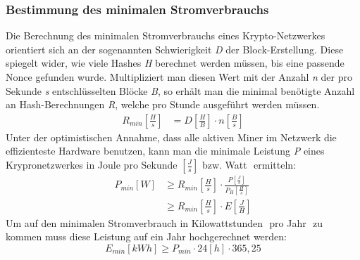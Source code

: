 \documentclass[12pt]{article}
\begin{document}
\subsubsection{Bestimmung des minimalen Stromverbrauchs}
Die Berechnung des minimalen Stromverbrauchs eines Krypto-Netzwerkes orientiert sich an der sogenannten Schwierigkeit \textit{D} der Block-Erstellung. Diese spiegelt wider, wie viele Hashes \textit{H} berechnet werden müssen, bis eine passende Nonce gefunden wurde. Multipliziert man diesen Wert mit der Anzahl \textit{n} der pro Sekunde \textit{s} entschlüsselten Blöcke \textit{B}, so erhält man die minimal benötigte Anzahl an Hash-Berechnungen \textit{R}, welche pro Stunde ausgeführt werden müssen.
\begin{align}
    R_{min}\left[\frac{H}{s}\right]&=D\left[\frac{H}{B}\right]\cdot n\left[\frac{B}{s}\right]
\end{align}
\clearpage
\noindent Unter der optimistischen Annahme, dass alle aktiven Miner im Netzwerk die effizienteste Hardware benutzen, kann man die minimale Leistung \textit{P} eines Krypronetzwerkes in Joule pro Sekunde \begin{math}\left[\frac{J}{s}\right]\end{math} bzw. Watt \begin{math}[W]\end{math} ermitteln:
\begin{align*}
    P_{min} [W]&\geq R_{min}\left[\frac{H}{s}\right]\cdot \frac{P\left[\frac{J}{s}\right]}{P_H\left[\frac{H}{s}\right]}\\
    &\geq R_{min}\left[\frac{H}{s}\right]\cdot E\left[\frac{J}{H}\right]
\end{align*}
Um auf den minimalen Stromverbrauch in Kilowattstunden \begin{math}[kWh]\end{math} pro Jahr \begin{math}[a]\end{math} zu kommen muss diese Leistung auf ein Jahr hochgerechnet werden:
\[ E_{min} [kWh] \geq P_{min}\cdot 24[h]\cdot 365,25\]
\end{document}
